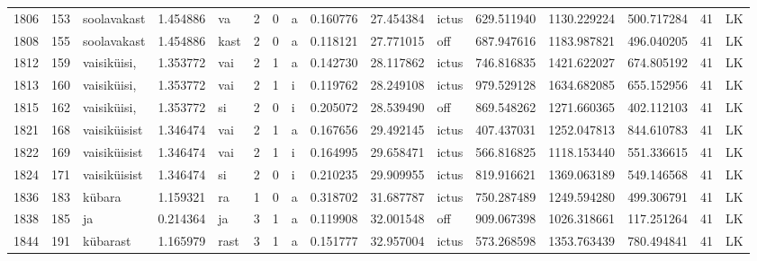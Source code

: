 \begin{tabular}{lrlrllllrrlrrrll}
1806 &         153 &      soolavakast &  1.454886 &      va &        2 &      0 &       a &      0.160776 &     27.454384 &  ictus &   629.511940 &  1130.229224 &   500.717284 &     41 &        LK \\
1808 &         155 &      soolavakast &  1.454886 &    kast &        2 &      0 &       a &      0.118121 &     27.771015 &    off &   687.947616 &  1183.987821 &   496.040205 &     41 &        LK \\
1812 &         159 &      vaisiküisi, &  1.353772 &     vai &        2 &      1 &       a &      0.142730 &     28.117862 &  ictus &   746.816835 &  1421.622027 &   674.805192 &     41 &        LK \\
1813 &         160 &      vaisiküisi, &  1.353772 &     vai &        2 &      1 &       i &      0.119762 &     28.249108 &  ictus &   979.529128 &  1634.682085 &   655.152956 &     41 &        LK \\
1815 &         162 &      vaisiküisi, &  1.353772 &      si &        2 &      0 &       i &      0.205072 &     28.539490 &    off &   869.548262 &  1271.660365 &   402.112103 &     41 &        LK \\
1821 &         168 &     vaisiküisist &  1.346474 &     vai &        2 &      1 &       a &      0.167656 &     29.492145 &  ictus &   407.437031 &  1252.047813 &   844.610783 &     41 &        LK \\
1822 &         169 &     vaisiküisist &  1.346474 &     vai &        2 &      1 &       i &      0.164995 &     29.658471 &  ictus &   566.816825 &  1118.153440 &   551.336615 &     41 &        LK \\
1824 &         171 &     vaisiküisist &  1.346474 &      si &        2 &      0 &       i &      0.210235 &     29.909955 &  ictus &   819.916621 &  1369.063189 &   549.146568 &     41 &        LK \\
1836 &         183 &           kübara &  1.159321 &      ra &        1 &      0 &       a &      0.318702 &     31.687787 &  ictus &   750.287489 &  1249.594280 &   499.306791 &     41 &        LK \\
1838 &         185 &               ja &  0.214364 &      ja &        3 &      1 &       a &      0.119908 &     32.001548 &    off &   909.067398 &  1026.318661 &   117.251264 &     41 &        LK \\
1844 &         191 &         kübarast &  1.165979 &    rast &        3 &      1 &       a &      0.151777 &     32.957004 &  ictus &   573.268598 &  1353.763439 &   780.494841 &     41 &        LK \\

\end{tabular}
